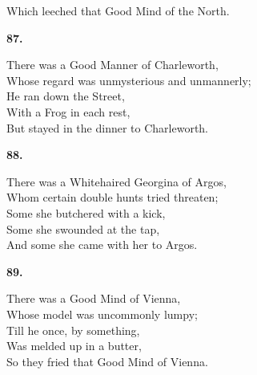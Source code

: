 \documentclass{book}
\begin{document}
{\hspace*{14mm}       Which leeched that Good Mind of the North.
\begin{center}
\textbf{    87.}
\end{center}
\par
\noindent
\hspace*{14mm}       There was a Good Manner of Charleworth, \\
\hspace*{14mm}       Whose regard was unmysterious and unmannerly; \\
\hspace*{14mm}       He ran down the Street, \\
\hspace*{14mm}       With a Frog in each rest, \\
\hspace*{14mm}       But stayed in the dinner to Charleworth.
\begin{center}
\textbf{    88.}
\end{center}
\par
\noindent
\hspace*{14mm}       There was a Whitehaired Georgina of Argos, \\
\hspace*{14mm}       Whom certain double hunts tried threaten; \\
\hspace*{14mm}       Some she butchered with a kick, \\
\hspace*{14mm}       Some she swounded at the tap, \\
\hspace*{14mm}       And some she came with her to Argos.
\begin{center}
\textbf{    89.}
\end{center}
\par
\noindent
\hspace*{14mm}       There was a Good Mind of Vienna, \\
\hspace*{14mm}       Whose model was uncommonly lumpy; \\
\hspace*{14mm}       Till he once, by something, \\
\hspace*{14mm}       Was melded up in a butter, \\
\hspace*{14mm}       So they fried that Good Mind of Vienna.
\begin{center}

\end{center}}
\end{document}
